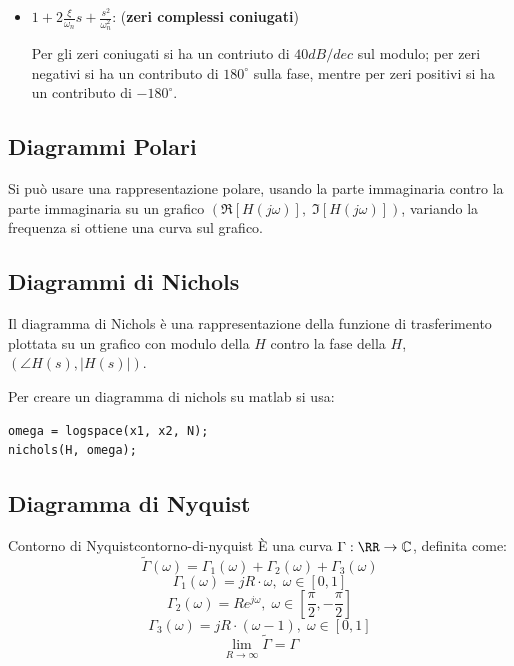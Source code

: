 \documentclass[12pt]{article}
\begin{document}
\begin{itemize}
        Nell'intorno di $\omega_n$ si trova questo picco, il cui valore massimo pu\`o essere espresso dalla formula:
        \[ M_r = \frac{1}{2\zeta \sqrt{1 - \zeta^{2}}}  \]

        alla frequenza:
        \[ \omega_r = \omega_n \sqrt{1 - 2\zeta^{2}} \]

    \item $\displaystyle 1 + 2 \frac{\xi}{\omega_n}s + \frac{s^{2}}{\omega_n^{2}} $: (\textbf{zeri complessi coniugati})

        Per gli zeri coniugati si ha un contriuto di $40dB/dec$ sul modulo; per zeri negativi si ha un contributo di $180^{\circ}$ sulla fase, mentre per zeri positivi si ha un contributo di $-180^{\circ}$.
\end{itemize}

\subsection{Diagrammi Polari}
Si pu\`o usare una rappresentazione polare, usando la parte immaginaria contro la parte immaginaria su un grafico $(\Re[H(j\omega)],\;\Im[H(j\omega)])$, variando la frequenza si ottiene una curva sul grafico.

\subsection{Diagrammi di Nichols}
Il diagramma di Nichols \`e una rappresentazione della funzione di trasferimento plottata su un grafico con modulo della $H$ contro la fase della $H$, $(\angle H(s), |H(s)|)$.

Per creare un diagramma di nichols su matlab si usa:
\begin{lstlisting}
omega = logspace(x1, x2, N);
nichols(H, omega);
\end{lstlisting}


\subsection{Diagramma di Nyquist}

\begin{definition}{Contorno di Nyquist}{contorno-di-nyquist}
    \`E una curva $\Gamma: \RR \to \mathbb{C}$, definita come:
    \[ \tilde{\Gamma}(\omega) = \Gamma_1(\omega) +  \Gamma_2(\omega) + \Gamma_3(\omega) \]
    \[ \Gamma_1(\omega) = jR\cdot\omega,\; \omega \in [0, 1] \]
    \[ \Gamma_2(\omega) = Re^{j\omega},\;\omega \in \left[\frac{\pi}{2}, -\frac{\pi}{2} \right]  \]
    \[ \Gamma_3(\omega) = jR\cdot(\omega-1),\; \omega \in [0, 1] \]
    \[\lim_{R \to \infty} \tilde{\Gamma} = \Gamma \]
\end{definition}
\end{document}
